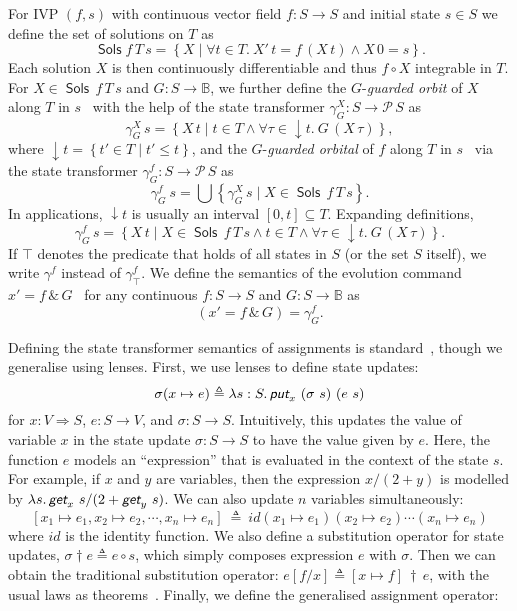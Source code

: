 \documentclass[envcountsame,envcountsect]{llncs}
\newcommand{\Pow}{\mathcal{P}}
\newcommand{\bools}{\mathbb{B}}
\newcommand{\Sols}{\mathop{\mathsf{Sols}}}
\newcommand{\defs}{\triangleq}
\newcommand{\lput}{\textit{\textsf{put}}}
\newcommand{\lget}{\textit{\textsf{get}}}
\newcommand{\lto}{\Longrightarrow}
\newcommand{\subapp}{\mathop{\,\dagger\,}}
\begin{document}
For IVP $(f,s)$ with continuous vector field $f:S\to S$ and initial
state $s\in S$ we define the set of solutions on
$T$ as
\begin{equation*}
\Sols f\, T\, s = \left\{X \mid \forall t\in T.\  X'\, t = f\, (X\, t)\land X\, 0 = s\right\}.
\end{equation*}
Each solution $X$ is then continuously differentiable and thus
$f\circ X$ integrable in $T$.  For $X\in \Sols\, f\, T\, s$ and
$G:S\to\bools$, we further define the $G$-\emph{guarded orbit} of $X$
along $T$ in $s$~\cite{MuniveS19} with the help of the state transformer
$\gamma^X_G:S\to \Pow\, S$ as 
\begin{equation*}
\gamma^X_{G}\, s= \left\{X\, t\mid t\in T\land \forall \tau\in
{\downarrow}t.\ G\, (X\, \tau)\right\},
\end{equation*}
where ${\downarrow}t = \left\{t'\in T\mid t'\le t\right\}$, and the
$G$-\emph{guarded orbital} of $f$ along $T$ in $s$~\cite{MuniveS19}
via the state transformer $\gamma^f_G:S\to \Pow\, S$ as
\begin{equation*}
  \gamma^f_G\ s = \bigcup\left\{\gamma^X_G\, s\mid X\in \Sols\, f\, T\, s\right\}.
\end{equation*}
In applications, ${\downarrow}t$ is usually an interval
$[0,t]\subseteq T$.  Expanding definitions,
\begin{equation*}
\gamma^f_G\, s = \left\{X\, t \mid X\in \Sols\, f\, T\, s \land t\in T
\land \forall \tau\in{\downarrow}t.\ G\, (X\, \tau)\right\}.
\end{equation*}
If $\top$ denotes the predicate that holds of all states in $S$ (or
the set $S$ itself), we write $\gamma^f$ instead of
$\gamma^f_\top$. We define the semantics of the evolution command
$x'= f\, \&\, G$~\cite{MuniveS19} for any continuous $f:S\to S$ and
$G:S\to \bools$ as
\begin{equation}
{\left(x'= f\, \&\, G\right)} = \gamma^f_G.\label{eq:st-evl}\tag{st-evl}
\end{equation}

Defining the state transformer semantics of assignments is
standard~\cite{MuniveS19}, though we generalise using lenses. First,
we use lenses to define state updates:
$$\sigma(x\mapsto e) \defs \lambda s : S.\, \lput_x ~ (\sigma~s) ~ (e~s)$$
for $x : V \lto S$, $e : S \to V$, and $\sigma : S \to S$.
Intuitively, this updates the value of variable $x$ in the state
update $\sigma : S \to S$ to have the value given by $e$. Here, the
function $e$ models an ``expression'' that is evaluated in
the context of the state $s$. For example, if $x$ and $y$ are
variables, then the expression $x / (2 + y)$ is modelled by
$\lambda s. \, \lget_x~s / (2 + \lget_y~s)$. We can also update $n$
variables simultaneously:
$$[x_1 \mapsto e_1, x_2 \mapsto e_2, \cdots, x_n \mapsto e_n] ~\defs~ id(x_1 \mapsto e_1)(x_2 \mapsto e_2)\cdots(x_n \mapsto e_n)$$ 
where $id$ is the identity function. We also define a substitution
operator for state updates, $\sigma \dagger e \defs e \circ s$, which
simply composes expression $e$ with $\sigma$. Then we can obtain the
traditional substitution operator:
$e[f/x] \defs [x \mapsto f] \subapp e$, with the usual laws as
theorems~\cite{FosterZW16}. Finally, we define the generalised
assignment operator:
\end{document}
